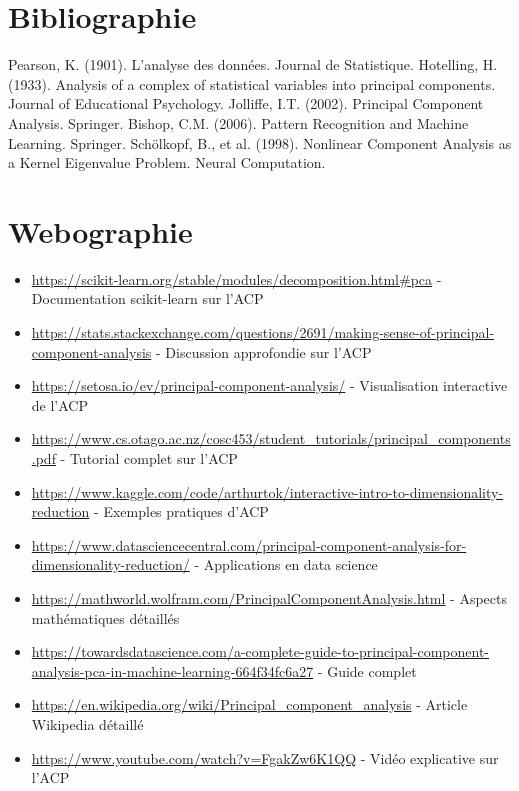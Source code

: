 \documentclass[a4paper,12pt]{report}
\begin{document}
\chapter{Bibliographie}
\begin{thebibliography}{9}
 Pearson, K. (1901). L'analyse des données. Journal de Statistique.
 Hotelling, H. (1933). Analysis of a complex of statistical variables into principal components. Journal of Educational Psychology.
 Jolliffe, I.T. (2002). Principal Component Analysis. Springer.
 Bishop, C.M. (2006). Pattern Recognition and Machine Learning. Springer.
 Schölkopf, B., et al. (1998). Nonlinear Component Analysis as a Kernel Eigenvalue Problem. Neural Computation.
\end{thebibliography}

\chapter*{Webographie}
\begin{itemize}
  \item \url{https://scikit-learn.org/stable/modules/decomposition.html#pca} - Documentation scikit-learn sur l'ACP
  \item \url{https://stats.stackexchange.com/questions/2691/making-sense-of-principal-component-analysis} - Discussion approfondie sur l'ACP
  \item \url{https://setosa.io/ev/principal-component-analysis/} - Visualisation interactive de l'ACP
  \item \url{https://www.cs.otago.ac.nz/cosc453/student_tutorials/principal_components.pdf} - Tutorial complet sur l'ACP
  \item \url{https://www.kaggle.com/code/arthurtok/interactive-intro-to-dimensionality-reduction} - Exemples pratiques d'ACP
  \item \url{https://www.datasciencecentral.com/principal-component-analysis-for-dimensionality-reduction/} - Applications en data science
  \item \url{https://mathworld.wolfram.com/PrincipalComponentAnalysis.html} - Aspects mathématiques détaillés
  \item \url{https://towardsdatascience.com/a-complete-guide-to-principal-component-analysis-pca-in-machine-learning-664f34fc6a27} - Guide complet
  \item \url{https://en.wikipedia.org/wiki/Principal_component_analysis} - Article Wikipedia détaillé
  \item \url{https://www.youtube.com/watch?v=FgakZw6K1QQ} - Vidéo explicative sur l'ACP
\end{itemize}
\end{document}
